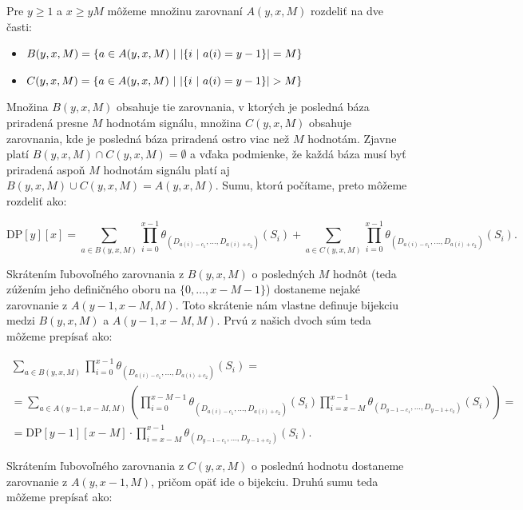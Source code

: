 Pre $y \geq 1$ a $x \geq y M$ môžeme množinu zarovnaní $A(y, x, M)$ rozdeliť na dve časti:

\begin{itemize}

\item $B(y, x, M) = \{a \in A(y, x, M) ~|~ \abs*{\{i ~|~ a(i) = y-1\}} = M\}$
\item $C(y, x, M) = \{a \in A(y, x, M) ~|~ \abs*{\{i ~|~ a(i) = y-1\}} > M\}$

\end{itemize}

Množina $B(y, x, M)$ obsahuje tie zarovnania, v ktorých je posledná báza priradená presne $M$ hodnotám signálu, množina $C(y, x, M)$ obsahuje
zarovnania, kde je posledná báza priradená ostro viac než $M$ hodnotám. Zjavne platí $B(y, x, M) \cap C(y, x, M) = \emptyset$ a vďaka podmienke,
že každá báza musí byť priradená aspoň $M$ hodnotám signálu platí aj $B(y, x, M) \cup C(y, x, M) = A(y, x, M)$. Sumu, ktorú počítame, preto
môžeme rozdeliť ako:

$$\textrm{DP}[y][x] = \sum\limits_{a \in B(y, x, M)} \prod\limits_{i=0}^{x-1} \theta_{(D_{a(i)-c_1}, \dots, D_{a(i)+c_2})}(S_i)
+ \sum\limits_{a \in C(y, x, M)} \prod\limits_{i=0}^{x-1} \theta_{(D_{a(i)-c_1}, \dots, D_{a(i)+c_2})}(S_i) \text{.}$$

Skrátením ľubovoľného zarovnania z $B(y, x, M)$ o posledných $M$ hodnôt (teda zúžením jeho definičného oboru na $\{0, \dots, x-M-1\}$)
dostaneme nejaké zarovnanie z $A(y-1, x-M, M)$. Toto skrátenie nám vlastne definuje bijekciu medzi $B(y, x, M)$ a $A(y-1, x-M, M)$. Prvú z našich dvoch
súm teda môžeme prepísať ako:

\begin{multline*}
\sum\limits_{a \in B(y, x, M)} \prod\limits_{i=0}^{x-1} \theta_{(D_{a(i)-c_1}, \dots, D_{a(i)+c_2})}(S_i) = \\
= \sum\limits_{a \in A(y-1, x-M, M)}\left( \prod\limits_{i=0}^{x-M-1} \theta_{(D_{a(i)-c_1}, \dots, D_{a(i)+c_2})}(S_i)  \prod\limits_{i=x-M}^{x-1}\theta_{(D_{y-1-c_1}, \dots, D_{y-1+c_2})}(S_i)\right) = \\
= \mathrm{DP}[y-1][x-M] \cdot \prod\limits_{i=x-M}^{x-1}\theta_{(D_{y-1-c_1}, \dots, D_{y-1+c_2})}(S_i) \text{.}
\end{multline*}

Skrátením ľubovoľného zarovnania z $C(y, x, M)$ o poslednú hodnotu dostaneme zarovnanie z $A(y, x-1, M)$, pričom opäť ide o bijekciu. Druhú sumu teda
môžeme prepísať ako:


